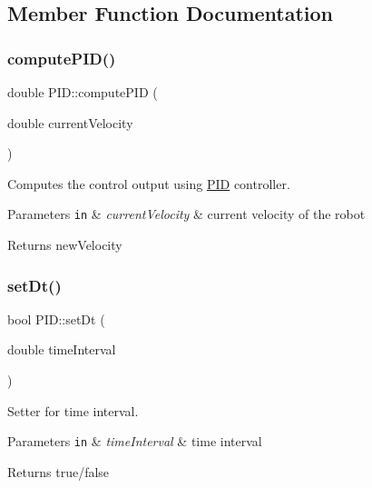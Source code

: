 \subsection{Member Function Documentation}
\mbox{\label{classPID_aa7eaae8c7f3a11bb4d53ff8ee17df10f}} 
\subsubsection{\texorpdfstring{compute\+P\+I\+D()}{computePID()}}
{\footnotesize\ttfamily double P\+I\+D\+::compute\+P\+ID (\begin{DoxyParamCaption}\item[{double}]{current\+Velocity }\end{DoxyParamCaption})}



Computes the control output using \hyperlink{classPID}{P\+ID} controller. 


\begin{DoxyParams}[1]{Parameters}
\mbox{\tt in}  & {\em current\+Velocity} & current velocity of the robot \\
\hline
\end{DoxyParams}
\begin{DoxyReturn}{Returns}
new\+Velocity 
\end{DoxyReturn}
\mbox{\label{classPID_a182527b0cc7c5869fbb14508b9b35c41}} 
\subsubsection{\texorpdfstring{set\+Dt()}{setDt()}}
{\footnotesize\ttfamily bool P\+I\+D\+::set\+Dt (\begin{DoxyParamCaption}\item[{double}]{time\+Interval }\end{DoxyParamCaption})}



Setter for time interval. 


\begin{DoxyParams}[1]{Parameters}
\mbox{\tt in}  & {\em time\+Interval} & time interval \\
\hline
\end{DoxyParams}
\begin{DoxyReturn}{Returns}
true/false 
\end{DoxyReturn}
\mbox{\label{classPID_a91359adee27385a381690ae548afe976}} 
